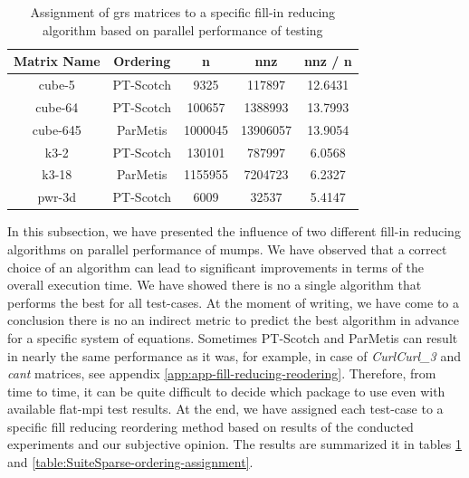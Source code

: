 \begin{table}[htpb]
\centering
\begin{tabular}{|c|c|c|c|c|}
\hline
Matrix Name & Ordering  & n       & nnz      & nnz / n \\ \hline
cube-5      & PT-Scotch & 9325    & 117897   & 12.6431 \\ \hline
cube-64     & PT-Scotch & 100657  & 1388993  & 13.7993 \\ \hline
cube-645    & ParMetis  & 1000045 & 13906057 & 13.9054 \\ \hline
k3-2        & PT-Scotch & 130101  & 787997   & 6.0568  \\ \hline
k3-18       & ParMetis  & 1155955 & 7204723  & 6.2327  \\ \hline
pwr-3d      & PT-Scotch & 6009    & 32537    & 5.4147  \\ \hline
\end{tabular}
\caption{Assignment of \acrshort{grs} matrices to a specific fill-in reducing algorithm based on parallel performance of testing}
\label{table:GRS-ordering-assignment}
\end{table}


In this subsection, we have presented the influence of  two different fill-in reducing algorithms on parallel performance of \acrshort{mumps}. We have observed that a correct choice of an algorithm can lead to significant improvements in terms of the overall execution time. We have showed there is no a single algorithm that performs the best for all test-cases. At the moment of writing, we have come to a conclusion there is no an indirect metric to predict the best algorithm in advance for a specific system of equations. Sometimes PT-Scotch and ParMetis can result in nearly the same performance as it was, for example, in case of \textit{CurlCurl\_3} and \textit{cant} matrices, see appendix \ref{app:app-fill-reducing-reodering}. Therefore, from time to time, it can be quite difficult to decide which package to use even with available flat-\acrshort{mpi} test results. At the end, we have assigned each test-case to a specific fill reducing reordering method based on results of the conducted experiments and our subjective opinion. The results are summarized it in tables \ref{table:GRS-ordering-assignment} and \ref{table:SuiteSparse-ordering-assignment}. \\ 


